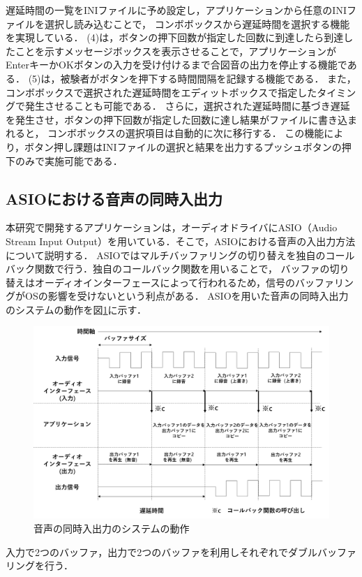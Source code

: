 遅延時間の一覧をINIファイルに予め設定し，アプリケーションから任意のINIファイルを選択し読み込むことで，
コンボボックスから遅延時間を選択する機能を実現している．
(4)は，ボタンの押下回数が指定した回数に到達したら到達したことを示すメッセージボックスを表示させることで，アプリケーションがEnterキーかOKボタンの入力を受け付けるまで合図音の出力を停止する機能である．
(5)は，被験者がボタンを押下する時間間隔を記録する機能である．
また，コンボボックスで選択された遅延時間をエディットボックスで指定したタイミングで発生させることも可能である．
さらに，選択された遅延時間に基づき遅延を発生させ，ボタンの押下回数が指定した回数に達し結果がファイルに書き込まれると，
コンボボックスの選択項目は自動的に次に移行する．
この機能により，ボタン押し課題はINIファイルの選択と結果を出力するプッシュボタンの押下のみで実施可能である．
\subsection{ASIOにおける音声の同時入出力}
本研究で開発するアプリケーションは，オーディオドライバにASIO（Audio Stream Input Output）を用いている．そこで，ASIOにおける音声の入出力方法について説明する．
ASIOではマルチバッファリングの切り替えを独自のコールバック関数で行う．独自のコールバック関数を用いることで，
バッファの切り替えはオーディオインターフェースによって行われるため，信号のバッファリングがOSの影響を受けないという利点がある．
ASIOを用いた音声の同時入出力のシステムの動作を図\ref{fig:delay_theory}に示す．
\begin{figure}[tbp]
  \centering
  \includegraphics[scale=0.12]{figures/System/Delay_theory_2.pdf}
  \caption{音声の同時入出力のシステムの動作}
  \label{fig:delay_theory}
\end{figure}
入力で2つのバッファ，出力で2つのバッファを利用しそれぞれでダブルバッファリングを行う．
